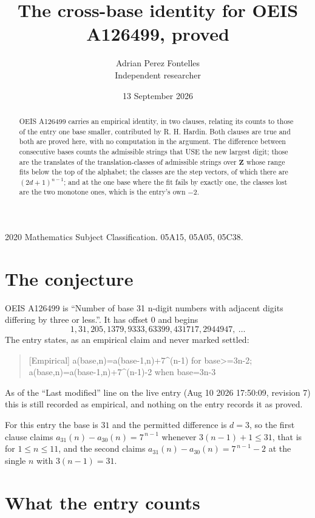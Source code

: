 \documentclass[11pt,a4paper]{article}
\title{The cross-base identity for OEIS A126499, proved}
\author{Adrian Perez Fontelles\\ \small Independent researcher}
\date{13 September 2026}
\theoremstyle{plain}
\theoremstyle{definition}
\begin{document}
\maketitle

\begin{abstract}
OEIS A126499 carries an empirical identity, in two clauses, relating its counts to those of the
entry one base smaller, contributed by R. H. Hardin. Both clauses are true and both are proved
here, with no computation in the argument. The difference between consecutive bases counts the
admissible strings that USE the new largest digit; those are the translates of the
translation-classes of admissible strings over $\mathbf{Z}$ whose range fits below the top of
the alphabet; the classes are the step vectors, of which there are $(2d+1)^{n-1}$; and at the
one base where the fit fails by exactly one, the classes lost are the two monotone ones, which
is the entry's own $-2$.
\end{abstract}

\noindent\small 2020 Mathematics Subject Classification. 05A15, 05A05, 05C38.\normalsize

\section{The conjecture}

OEIS A126499 is ``Number of base 31 n-digit numbers with adjacent digits differing by three or less.''. It has offset $0$ and begins
\[
1, 31, 205, 1379, 9333, 63399, 431717, 2944947,\ \dots
\]
The entry states, as an empirical claim and never marked settled:
\begin{quote}
[Empirical] a(base,n)=a(base-1,n)+7\textasciicircum{}(n-1) for base>=3n-2; a(base,n)=a(base-1,n)+7\textasciicircum{}(n-1)-2 when base=3n-3
\end{quote}
As of the ``Last modified'' line on the live entry (Aug 10 2026 17:50:09, revision 7)
this is still recorded as empirical, and nothing on the entry records it as proved.

For this entry the base is $31$ and the permitted difference is $d=3$, so the first clause
claims $a_{31}(n)-a_{30}(n)=7^{\,n-1}$ whenever $3(n-1)+1\le31$, that is for
$1\le n\le11$, and the second claims $a_{31}(n)-a_{30}(n)=7^{\,n-1}-2$ at the single
$n$ with $3(n-1)=31$.

\section{What the entry counts}
\end{document}
